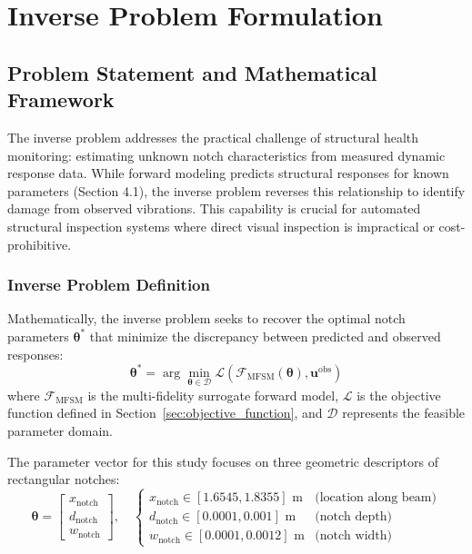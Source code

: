 \documentclass[12pt,a4paper]{report}
\begin{document}
\section{Inverse Problem Formulation}
\label{sec:inverse_problem}

\subsection{Problem Statement and Mathematical Framework}

The inverse problem addresses the practical challenge of structural health monitoring: estimating unknown notch characteristics from measured dynamic response data. While forward modeling predicts structural responses for known parameters (Section 4.1), the inverse problem reverses this relationship to identify damage from observed vibrations. This capability is crucial for automated structural inspection systems where direct visual inspection is impractical or cost-prohibitive.

\subsubsection{Inverse Problem Definition}
Mathematically, the inverse problem seeks to recover the optimal notch parameters $\boldsymbol{\theta}^*$ that minimize the discrepancy between predicted and observed responses:
\begin{equation}
\boldsymbol{\theta}^* = \arg\min_{\boldsymbol{\theta} \in \mathcal{D}} \mathcal{L}\left(\mathcal{F}_{\text{MFSM}}(\boldsymbol{\theta}), \mathbf{u}^{\text{obs}}\right)
\label{eq:inverse_optimization}
\end{equation}
where $\mathcal{F}_{\text{MFSM}}$ is the multi-fidelity surrogate forward model, $\mathcal{L}$ is the objective function defined in Section~\ref{sec:objective_function}, and $\mathcal{D}$ represents the feasible parameter domain.

The parameter vector for this study focuses on three geometric descriptors of rectangular notches:
\begin{equation}
\boldsymbol{\theta} = \begin{bmatrix}
x_{\text{notch}} \\ d_{\text{notch}} \\ w_{\text{notch}}
\end{bmatrix}, \quad
\begin{cases}
x_{\text{notch}} \in [1.6545, 1.8355] \text{ m} & \text{(location along beam)} \\
d_{\text{notch}} \in [0.0001, 0.001] \text{ m} & \text{(notch depth)} \\
w_{\text{notch}} \in [0.0001, 0.0012] \text{ m} & \text{(notch width)}
\end{cases}
\label{eq:parameter_bounds}
\end{equation}
\end{document}
